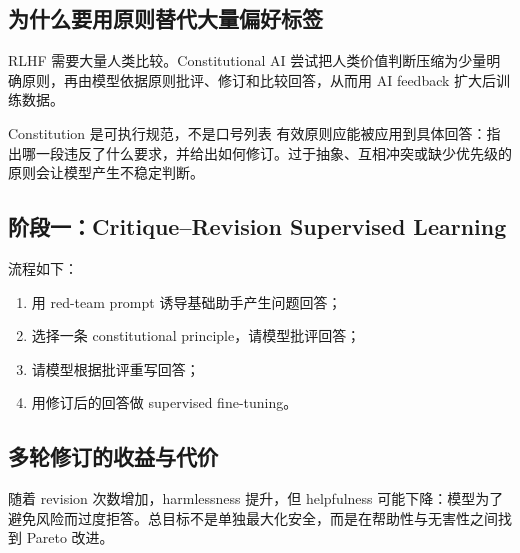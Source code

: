\documentclass[a4paper]{article}
\begin{document}
\subsection{为什么要用原则替代大量偏好标签}

RLHF 需要大量人类比较。Constitutional AI 尝试把人类价值判断压缩为少量明确原则，再由模型依据原则批评、修订和比较回答，从而用 AI feedback 扩大后训练数据。


\begin{knowledgebox}{Constitution 是可执行规范，不是口号列表}
有效原则应能被应用到具体回答：指出哪一段违反了什么要求，并给出如何修订。过于抽象、互相冲突或缺少优先级的原则会让模型产生不稳定判断。
\end{knowledgebox}

\subsection{阶段一：Critique--Revision Supervised Learning}

流程如下：

\begin{enumerate}
    \item 用 red-team prompt 诱导基础助手产生问题回答；
    \item 选择一条 constitutional principle，请模型批评回答；
    \item 请模型根据批评重写回答；
    \item 用修订后的回答做 supervised fine-tuning。
\end{enumerate}




\subsection{多轮修订的收益与代价}

随着 revision 次数增加，harmlessness 提升，但 helpfulness 可能下降：模型为了避免风险而过度拒答。总目标不是单独最大化安全，而是在帮助性与无害性之间找到 Pareto 改进。
\end{document}
